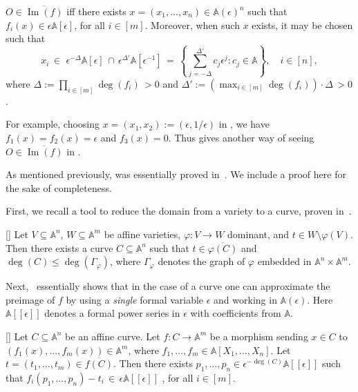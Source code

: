 \documentclass{toc}
\newcommand{\aff}{\mathbb{A}}
\DeclareMathOperator{\im}{\mathrm{Im}}
\newcommand{\ol}[1]{\overline{#1}}
\begin{document}
\begin{theorem}[classical]\label{thm_approx}
$O\in \overline{\im(f)}$ iff there exists $x=(x_1,\dots,x_n)\in \aff(\epsilon)^n$ such that $f_i(x)\in \epsilon \aff[\epsilon]$, for all $i\in [m]$. Moreover, when such $x$ exists, it may be chosen such that
\[
x_i \,\in\,\, \epsilon^{-\Delta} \aff[\epsilon] \,\cap\, \epsilon^{\Delta'} \aff[\epsilon^{-1}] \,=\, \left\{\sum_{j=-\Delta}^{\Delta'} c_j \epsilon^j: c_j\in \aff\right\}, \quad i\in[n],
\]
where $\Delta:=\prod_{i\in[m]} \deg(f_i) \,>0$ and $\Delta':=(\max_{i\in[m]} \deg(f_i))\cdot \Delta \,>0$.
\end{theorem}

For example, choosing $x=(x_1,x_2):=(\epsilon, 1/\epsilon)$ in ,  we have $f_1(x)=f_2(x)=\epsilon$ and $f_3(x)=0$. Thus  gives another way of seeing  $O\in \ol{\im(f)}$ in .

As mentioned previously,  was  essentially proved  in~\cite{LL89}. We include a proof here for the sake of completeness.

First, we recall a tool to reduce the domain from a variety to a curve, proven in~\cite{LL89}.

\begin{lemma}
%
[{\cite[Proposition~1]{LL89}}] %
\label{lem_aux1}
Let $V\subseteq \aff^n$, $W\subseteq \aff^m$ be affine varieties, $\varphi: V\to W$ dominant, and $t\in W\setminus \varphi(V)$.
Then there exists a curve $C\subseteq \aff^n$ such that $t\in\overline{\varphi(C)}$ and $\deg(C)\leq \deg(\Gamma_\varphi)$, where $\Gamma_\varphi$ denotes the graph of $\varphi$ embedded in $\aff^n\times \aff^m$.
\end{lemma}

Next,~\cite{LL89} essentially shows that in the case of a curve one can approximate the preimage of $f$ by using a \emph{single} formal variable $\epsilon$ and working in $\aff(\epsilon)$. Here $\aff[[\epsilon]]$ denotes a formal power series in $\epsilon$ with coefficients from $\aff$.

\begin{lemma}
%
[{\cite[Corollary of Proposition~3]{LL89}}] %
\label{lem_aux2}
Let $C\subseteq \aff^n$ be an affine curve.  Let $f: C\to \aff^m$ be a morphism sending $x\in C$ to $(f_1(x),\dots,f_m(x))\in \aff^m$, where $f_1,\dots,f_m\in \aff[X_1,\dots,X_n]$. Let $t=(t_1,\dots,t_m)\in \overline{f(C)}$. Then there exists  $p_1,\dots,p_n\in \epsilon^{-\deg(C)}\aff[[\epsilon]]$ such that $f_i(p_1,\dots,p_n)-t_i \,\in\, \epsilon \aff[[\epsilon]]$ , for all $i\in [m]$.
\end{lemma}
\end{document}
